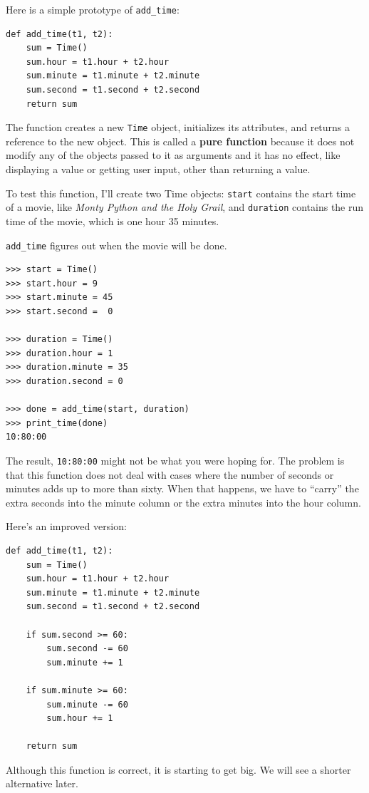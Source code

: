 \documentclass[10pt]{book}
\begin{document}
Here is a simple prototype of \verb"add_time":

\begin{verbatim}
def add_time(t1, t2):
    sum = Time()
    sum.hour = t1.hour + t2.hour
    sum.minute = t1.minute + t2.minute
    sum.second = t1.second + t2.second
    return sum
\end{verbatim}
%
The function creates a new {\tt Time} object, initializes its
attributes, and returns a reference to the new object.  This is called
a {\bf pure function} because it does not modify any of the objects
passed to it as arguments and it has no effect,
like displaying a value or getting user input,
other than returning a value.

To test this function, I'll create two Time objects: {\tt start}
contains the start time of a movie, like {\em Monty Python and the
Holy Grail}, and {\tt duration} contains the run time of the movie,
which is one hour 35 minutes.

\verb"add_time" figures out when the movie will be done.

\begin{verbatim}
>>> start = Time()
>>> start.hour = 9
>>> start.minute = 45
>>> start.second =  0

>>> duration = Time()
>>> duration.hour = 1
>>> duration.minute = 35
>>> duration.second = 0

>>> done = add_time(start, duration)
>>> print_time(done)
10:80:00
\end{verbatim}
%
The result, {\tt 10:80:00} might not be what you were hoping
for.  The problem is that this function does not deal with cases where the
number of seconds or minutes adds up to more than sixty.  When that
happens, we have to ``carry'' the extra seconds into the minute column
or the extra minutes into the hour column.

Here's an improved version:

\begin{verbatim}
def add_time(t1, t2):
    sum = Time()
    sum.hour = t1.hour + t2.hour
    sum.minute = t1.minute + t2.minute
    sum.second = t1.second + t2.second

    if sum.second >= 60:
        sum.second -= 60
        sum.minute += 1

    if sum.minute >= 60:
        sum.minute -= 60
        sum.hour += 1

    return sum
\end{verbatim}
%
Although this function is correct, it is starting to get big.
We will see a shorter alternative later.
\end{document}
